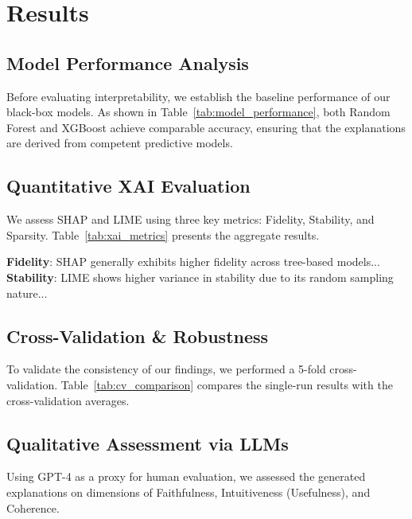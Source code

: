 \chapter{Results}
\label{ch:results}

\section{Model Performance Analysis}
Before evaluating interpretability, we establish the baseline performance of our black-box models. As shown in Table~\ref{tab:model_performance}, both Random Forest and XGBoost achieve comparable accuracy, ensuring that the explanations are derived from competent predictive models.



\section{Quantitative XAI Evaluation}
We assess SHAP and LIME using three key metrics: Fidelity, Stability, and Sparsity. Table~\ref{tab:xai_metrics} presents the aggregate results.





\textbf{Fidelity}: SHAP generally exhibits higher fidelity across tree-based models...
\textbf{Stability}: LIME shows higher variance in stability due to its random sampling nature...

\section{Cross-Validation \& Robustness}
To validate the consistency of our findings, we performed a 5-fold cross-validation. Table~\ref{tab:cv_comparison} compares the single-run results with the cross-validation averages.



\section{Qualitative Assessment via LLMs}
Using GPT-4 as a proxy for human evaluation, we assessed the generated explanations on dimensions of Faithfulness, Intuitiveness (Usefulness), and Coherence.





